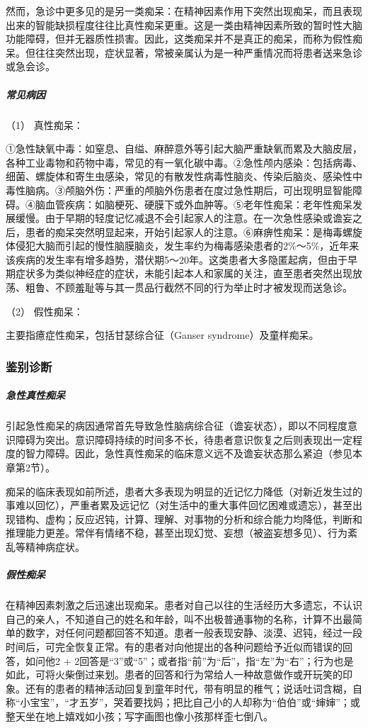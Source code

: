 然而，急诊中更多见的是另一类痴呆：在精神因素作用下突然出现痴呆，而且表现出来的智能缺损程度往往比真性痴呆更重。这是一类由精神因素所致的暂时性大脑功能障碍，但并无器质性损害。因此，这类痴呆并不是真正的痴呆，而称为假性痴呆。但往往突然出现，症状显著，常被亲属认为是一种严重情况而将患者送来急诊或急会诊。

\subparagraph{常见病因}

\hypertarget{text00050.htmlux5cux23CHP1-18-8-1-2-1}{}
（1） 真性痴呆：

①急性缺氧中毒：如窒息、自缢、麻醉意外等引起大脑严重缺氧而累及大脑皮层，各种工业毒物和药物中毒，常见的有一氧化碳中毒。②急性颅内感染：包括病毒、细菌、螺旋体和寄生虫感染，常见的有散发性病毒性脑炎、传染后脑炎、感染性中毒性脑病。③颅脑外伤：严重的颅脑外伤患者在度过急性期后，可出现明显智能障碍。④脑血管疾病：如脑梗死、硬膜下或外血肿等。⑤老年性痴呆：老年性痴呆发展缓慢。由于早期的轻度记忆减退不会引起家人的注意。在一次急性感染或谵妄之后，患者的痴呆突然明显起来，开始引起家人的注意。⑥麻痹性痴呆：是梅毒螺旋体侵犯大脑而引起的慢性脑膜脑炎，发生率约为梅毒感染患者的2\%～5\%，近年来该疾病的发生率有增多趋势，潜伏期5～20年。这类患者大多隐匿起病，但由于早期症状多为类似神经症的症状，未能引起本人和家属的关注，直至患者突然出现放荡、粗鲁、不顾羞耻等与其一贯品行截然不同的行为举止时才被发现而送急诊。

\hypertarget{text00050.htmlux5cux23CHP1-18-8-1-2-2}{}
（2） 假性痴呆：

主要指癔症性痴呆，包括甘瑟综合征（Ganser syndrome）及童样痴呆。

\subsubsection{鉴别诊断}

\subparagraph{急性真性痴呆}

引起急性痴呆的病因通常首先导致急性脑病综合征（谵妄状态），即以不同程度意识障碍为突出。意识障碍持续的时间多不长，待患者意识恢复之后则表现出一定程度的智力障碍。因此，急性真性痴呆的临床意义远不及谵妄状态那么紧迫（参见本章第2节）。

痴呆的临床表现如前所述，患者大多表现为明显的近记忆力降低（对新近发生过的事难以回忆），严重者累及远记忆（对生活中的重大事件回忆困难或遗忘），甚至出现错构、虚构；反应迟钝，计算、理解、对事物的分析和综合能力均降低，判断和推理能力更差。常伴有情绪不稳，甚至出现幻觉、妄想（被盗妄想多见）、行为紊乱等精神病症状。

\subparagraph{假性痴呆}

在精神因素刺激之后迅速出现痴呆。患者对自己以往的生活经历大多遗忘，不认识自己的亲人，不知道自己的姓名和年龄，叫不出极普通事物的名称，计算不出最简单的数字，对任何问题都回答不知道。患者一般表现安静、淡漠、迟钝，经过一段时间后，可完全恢复正常。有的患者对向他提出的各种问题给予近似而错误的回答，如问他2
+
2回答是“3”或“5”；或者指“前”为“后”，指“左”为“右”；行为也是如此，可将火柴倒过来划。患者的回答和行为常给人一种故意做作或开玩笑的印象。还有的患者的精神活动回复到童年时代，带有明显的稚气；说话吐词含糊，自称“小宝宝”，“才五岁”，哭着要找妈；把比自己小的人却称为“伯伯”或“婶婶”；或整天坐在地上嬉戏如小孩；写字画图也像小孩那样歪七倒八。

